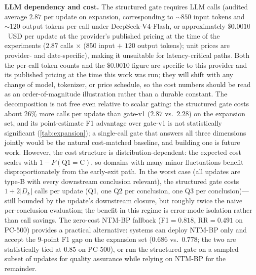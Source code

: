 \documentclass{article}
\theoremstyle{definition}
\begin{document}
\textbf{LLM dependency and cost.}  The structured gate requires LLM
calls (audited average $2.87$ per update on expansion, corresponding to
$\sim 850$ input tokens and $\sim 120$ output tokens per call
under DeepSeek-V4-Flash, or approximately $\$0.0010$~USD per update at
the provider's published pricing at the time of the experiments
($2.87$ calls $\times$ ($850$ input $+$ $120$ output tokens); unit prices
are provider- and date-specific),
making it unsuitable for latency-critical
paths.  Both the per-call token counts and the $\$0.0010$ figure are
specific to this provider and its published pricing at the time this
work was run; they will shift with any change of model, tokenizer, or
price schedule, so the cost numbers should be read as an
order-of-magnitude illustration rather than a durable constant.  The decomposition is not free even relative to scalar gating:
the structured gate costs about $26\%$ more calls per update than
gate-v1 ($2.87$ vs.\ $2.28$) on the expansion set, and its
point-estimate F1 advantage over gate-v1 is not statistically significant
(\cref{tab:expansion}); a single-call gate that answers all three
dimensions jointly would be the natural cost-matched baseline, and
building one is future work.  However, the cost structure is
distribution-dependent: the
expected cost scales with $1-P(\text{Q1}=\text{C})$, so domains with
many minor fluctuations benefit disproportionately from the early-exit
path.  In the worst case (all updates are type-B with every downstream
conclusion relevant), the structured gate costs $1+2|D_k|$ calls per
update (Q1, one Q2 per conclusion, one Q3 per conclusion)---still
bounded by the update's downstream closure, but roughly twice the
naive per-conclusion evaluation; the benefit in this regime is
error-mode isolation rather than call savings.
The zero-cost NTM-BP fallback (F1$ =0.818$,
RR$ =0.491$ on PC-500) provides a practical alternative: systems can
deploy NTM-BP only and accept the $9$-point F1 gap on the expansion
set ($0.686$ vs.\ $0.778$; the two are statistically tied at $0.85$ on
PC-500), or run the
structured gate on a sampled subset of updates for quality assurance
while relying on NTM-BP for the remainder.
\end{document}
